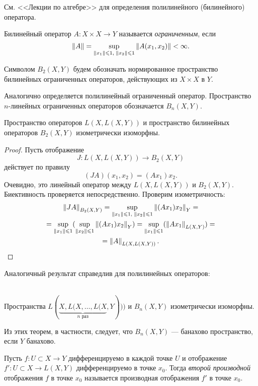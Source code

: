 См. <<Лекции по алгебре>> для определения полилинейного (билинейного) оператора.

\begin{definition}
    Билинейный оператор $A \colon X \times X \to Y$ называется \emph{ограниченным}, если
    \[ \left\|A\right\| = \sup_{\left\|x_1\right\| \leqslant 1, \; \left\|x_2\right\| \leqslant 1} \left\|A(x_1, x_2)\right\| < \infty. \]
\end{definition}
Символом $B_2(X, Y)$ будем обозначать нормированное пространство 
билинейных ограниченных операторов, действующих из $X \times X$ в $Y$.

Аналогично определяется полилинейный ограниченный оператор. Пространство $n$-линейных
ограниченных операторов обозначается $B_n(X, Y)$.

\begin{theorem}
    Пространство операторов $L(X, L(X, Y))$ и пространство
    билинейных операторов $B_2(X, Y)$ изометрически изоморфны.
\end{theorem}

\begin{proof}
    Пусть отображение 
    \[ J \colon L(X, L(X, Y)) \to B_2(X, Y) \] 
    действует по правилу
    \[ (JA)(x_1, x_2) = (Ax_1)x_2. \]
    Очевидно, это линейный оператор между $L(X, L(X, Y))$ и $B_2(X, Y)$.
    Биективность проверяется непосредственно. Проверим изометричность:
    \begin{multline*}
        \left\|JA\right\|_{B_2(X, Y)} = 
        \sup_{\left\|x_1\right\| \leqslant 1, \; \left\|x_2\right\| \leqslant 1} \left\|(Ax_1)x_2\right\|_{Y} = \\ = 
            \sup_{\left\|x_1\right\| \leqslant 1}(\sup_{\left\|x_2\right\| \leqslant 1} \left\|(Ax_1)x_2\right\|_{Y})  =
            \sup_{\left\|x_1\right\| \leqslant 1}(\left\|Ax_1\right\|_{L(X, Y)}) = \\ = \left\|A\right\|_{L(X, L(X, Y))}.
    \end{multline*}
\end{proof}

Аналогичный результат справедлив для полилинейных операторов:
\begin{theorem}\hfill\\
    \indent Пространства $L(\underbrace{X, L(X, \dotsc, L(X}_{n\text{ раз}}, Y)))$ и 
    $B_n(X, Y)$ изометрически изоморфны.
\end{theorem}

Из этих теорем, в частности, следует, что $B_n(X, Y)$ --- банахово пространство, если
$Y$ банахово.

\begin{definition}
    Пусть $f \colon U \subset X \to Y$ дифференцируемо в каждой точке $U$ и отображение
    $f' \colon U \subset X \to L(X, Y)$ дифференцируемо в точке $x_0$. Тогда \emph{второй
    производной} отображения $f$ в точке $x_0$ называется производная отображения $f'$ в точке
    $x_0$.
\end{definition}


